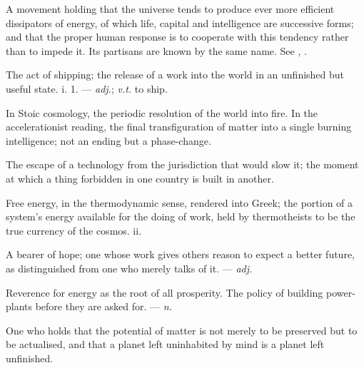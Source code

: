  A movement holding that the universe tends to produce ever more efficient dissipators of energy, of which life, capital and intelligence are successive forms; and that the proper human response is to cooperate with this tendency rather than to impede it. Its partisans are known by the same name. See , .

 The act of shipping; the release of a work into the world in an unfinished but useful state.   i. 1. ---  \textit{adj.};  \textit{v.t.} to ship.

  In Stoic cosmology, the periodic resolution of the world into fire.   In the accelerationist reading, the final transfiguration of matter into a single burning intelligence; not an ending but a phase-change.

 The escape of a technology from the jurisdiction that would slow it; the moment at which a thing forbidden in one country is built in another. 

 Free energy, in the thermodynamic sense, rendered into Greek; the portion of a system's energy available for the doing of work, held by thermotheists to be the true currency of the cosmos.   ii.

 A bearer of hope; one whose work gives others reason to expect a better future, as distinguished from one who merely talks of it. ---  \textit{adj.}

  Reverence for energy as the root of all prosperity.  The policy of building power-plants before they are asked for. ---  \textit{n.}

 One who holds that the potential of matter is not merely to be preserved but to be actualised, and that a planet left uninhabited by mind is a planet left unfinished.

